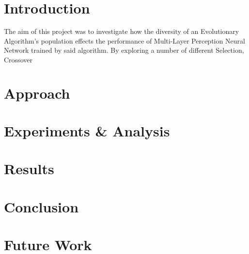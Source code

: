 \section{Introduction}
	The aim of this project was to investigate how the diversity of an Evolutionary Algorithm's population effects the performance of Multi-Layer Perception Neural Network trained by said algorithm. By exploring a number of different Selection, Crossover 	
\section{Approach}

\section{Experiments \& Analysis}

\section{Results}
	
\section{Conclusion}

\section{Future Work}
